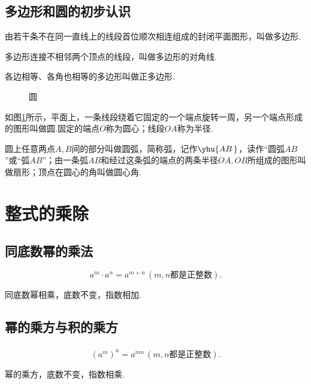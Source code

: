 \documentclass[fontset=windows]{ctexrep}
\begin{document}
\section{多边形和圆的初步认识}
\par 由若干条不在同一直线上的线段首位顺次相连组成的封闭平面图形，叫做{\heiti 多边形}.
\par 多边形连接不相邻两个顶点的线段，叫做多边形的{\heiti 对角线}.
\par 各边相等、各角也相等的多边形叫做{\heiti 正多边形}.
\begin{figure}[htbp]
    \centering
    \caption{圆}
    \label{fig:circle}
\end{figure}
\par 如图\ref{fig:circle}所示，平面上，一条线段绕着它固定的一个端点旋转一周，另一个端点形成的图形叫做{\heiti 圆}.固定的端点$O$称为圆心；线段$OA$称为半径.
\par 圆上任意两点$A,B$间的部分叫做{\heiti 圆弧}，简称{\heiti 弧}，记作$\yhu{AB\,}$，读作“圆弧$AB$”或“弧$AB$”；由一条弧$AB$和经过这条弧的端点的两条半径$OA,OB$所组成的图形叫做{\heiti 扇形}；顶点在圆心的角叫做{\heiti 圆心角}.
\chapter{整式的乘除}
\section{同底数幂的乘法}
\[a^m\cdot a^n=a^{m+n}\,(m,n都是正整数).\]
\par 同底数幂相乘，底数不变，指数相加.
\section{幂的乘方与积的乘方}
\subsection{}
\[(a^m)^n=a^{mn}\,(m,n都是正整数).\]
\par 幂的乘方，底数不变，指数相乘.
\end{document}
